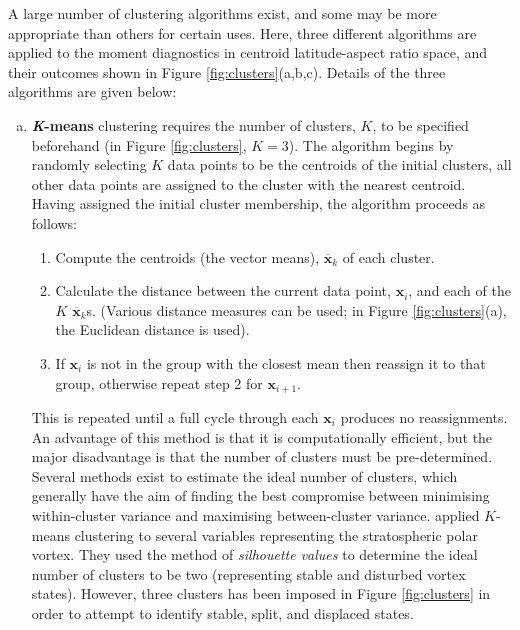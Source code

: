 A large number of clustering algorithms exist, and some may be more appropriate
than others for certain uses. Here, three different algorithms are applied to
the moment diagnostics in centroid latitude-aspect ratio space, and their
outcomes shown in Figure \ref{fig:clusters}(a,b,c). Details of the three
algorithms are given below:
\begin{enumerate}[(a)]
\item \textbf{\textit{K}-means} clustering requires the number of clusters, $K$,
  to be specified beforehand (in Figure \ref{fig:clusters}, $K=3$). The
  algorithm begins by randomly selecting $K$ data points to be the centroids of
  the initial clusters, all other data points are assigned to the cluster with
  the nearest centroid. Having assigned the initial cluster membership, the
  algorithm proceeds as follows:
  \begin{enumerate}[1.]
    \item Compute the centroids (the vector means), $\mathbf{\overline{x}}_k$
      of each cluster. 
    \item Calculate the distance between the current data point, $\mathbf{x}_i$,
      and each of the $K$ $\mathbf{\overline{x}}_k$s. (Various distance measures
      can be used; in Figure \ref{fig:clusters}(a), the Euclidean distance is
      used).
    \item If $\mathbf{x}_i$ is not in the group with the closest mean then
      reassign it to that group, otherwise repeat step 2 for $\mathbf{x}_{i+1}$.
  \end{enumerate}
  This is repeated until a full cycle through each $\mathbf{x}_i$ produces no
  reassignments. An advantage of this method is that it is computationally
  efficient, but the major disadvantage is that the number of clusters must be
  pre-determined. Several methods exist to estimate the ideal number of
  clusters, which generally have the aim of finding the best compromise between
  minimising within-cluster variance and maximising between-cluster
  variance. \citet{K.Coughlin2009} applied $K$-means clustering to several
  variables representing the stratospheric polar vortex. They used the method of
  \emph{silhouette values} \citep{Rousseeuw1987} to determine the ideal number
  of clusters to be two (representing stable and disturbed vortex
  states). However, three clusters has been imposed in Figure \ref{fig:clusters}
  in order to attempt to identify stable, split, and displaced states.



\end{enumerate}
